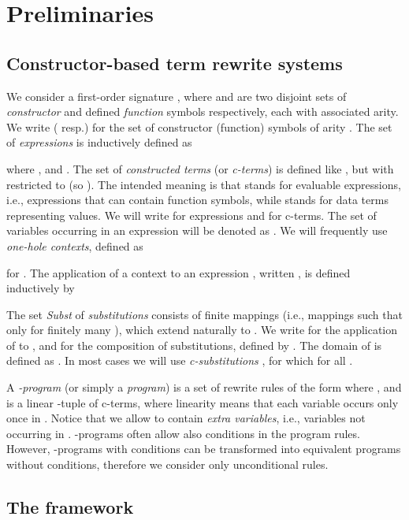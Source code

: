 \documentclass{llncs}
\begin{document}
\section{Preliminaries}\label{preliminaries}
\subsection{Constructor-based term rewrite systems}
\label{trs}


We consider a first-order signature
, where  and  are two disjoint sets of \emph{constructor}
and defined \emph{function} symbols respectively, each with associated arity. We
write  ( resp.) for the set of constructor (function) symbols of
arity .
The set  of \emph{expressions} is inductively defined as

where ,  and .
The set  of \emph{constructed terms} (or \emph{c-terms}) is
defined like , but with  restricted to  (so
). The intended meaning is that  stands for
evaluable expressions, i.e., expressions that can contain function
symbols, while  stands for data terms representing values. We
will write  for expressions and  for c-terms.
The set of variables occurring in an expression  will be denoted as
.
We will frequently use \emph{one-hole  contexts}, defined as

for . The application of a context  to
an expression , written , is defined inductively by


The set \emph{Subst} of \emph{substitutions} consists of finite
mappings  (i.e., mappings such that
 only for finitely many ), which extend
naturally to . We write  for the application of  to , and
 for the composition of substitutions, defined by
. The domain of  is defined as . In most cases we will use \emph{c-substitutions}
, for which  for all .




A \emph{\crwl{}-program} (or simply a \emph{program})
is a set of rewrite rules of the form  where
,  and  is a linear -tuple of
c-terms, where linearity means that each variable occurs only once in
. Notice that we allow  to contain \emph{extra
  variables}, i.e., variables not occurring in .
\crwl{}-programs often
allow also conditions in the program rules. However, \crwl{}-programs
with conditions can be transformed into equivalent programs without conditions,
therefore we consider only unconditional rules.



\subsection{The \crwl{} framework}
\end{document}
